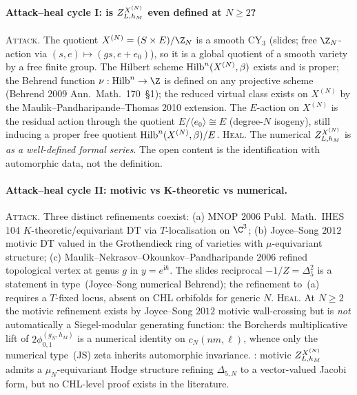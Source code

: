 \paragraph{Attack--heal cycle I: is $Z^{X^{(N)}}_{L, h_M}$ even defined at $N\geq 2$?}
\textsc{Attack.} The quotient $X^{(N)}=(S\times E)/\Z_N$ is a smooth
CY$_3$ (slides; free $\Z_N$-action via $(s,e)\mapsto(gs,e+e_0)$), so
it is a global quotient of a smooth variety by a free finite group.
The Hilbert scheme $\mathrm{Hilb}^n(X^{(N)},\beta)$ exists and is proper; the
Behrend function $\nu:\Hilb^n\to\Z$ is defined on any projective scheme
(Behrend 2009 Ann.~Math.~170~\S1); the reduced virtual class exists on
$X^{(N)}$ by the Maulik--Pandharipande--Thomas 2010 extension. The
$E$-action on $X^{(N)}$ is the residual action through the quotient
$E/\langle e_0\rangle\cong E$ (degree-$N$ isogeny), still inducing a
proper free quotient $\mathrm{Hilb}^n(X^{(N)},\beta)/E$. \textsc{Heal.} The
numerical $Z^{X^{(N)}}_{L, h_M}$ is \ClaimStatusTheorem{} \emph{as a well-defined
formal series}. The open content is the identification with automorphic
data, not the definition.

\paragraph{Attack--heal cycle II: motivic vs K-theoretic vs numerical.}
\textsc{Attack.} Three distinct refinements coexist: (a) MNOP $2006$
Publ.~Math.~IHES $104$ $K$-theoretic/equivariant DT via
$T$-localisation on $\C^3$; (b) Joyce--Song $2012$ motivic DT valued
in the Grothendieck ring of varieties with $\mu$-equivariant structure;
(c) Maulik--Nekrasov--Okounkov--Pandharipande $2006$ refined topological
vertex at genus $g$ in $y=e^{\mathrm i\hbar}$. The slides reciprocal
$-1/Z=\Delta_5^2$ is a statement in type~(Joyce--Song numerical Behrend);
the refinement to~(a) requires a $T$-fixed locus, absent on CHL orbifolds
for generic $N$. \textsc{Heal.} At $N\geq 2$ the motivic refinement
exists by Joyce--Song $2012$ motivic wall-crossing but is \emph{not}
automatically a Siegel-modular generating function: the Borcherds
multiplicative lift of $2\phi^{(g_N,h_M)}_{0,1}$ is a numerical identity
on $c_N(nm,\ell)$, whence only the numerical type~(JS) zeta inherits
automorphic invariance. \ClaimStatusConjectured{}: motivic $Z^{X^{(N)}}_{L, h_M}$
admits a $\mu_N$-equivariant Hodge structure refining $\Delta_{5,N}$
to a vector-valued Jacobi form, but no CHL-level
proof exists in the literature.

